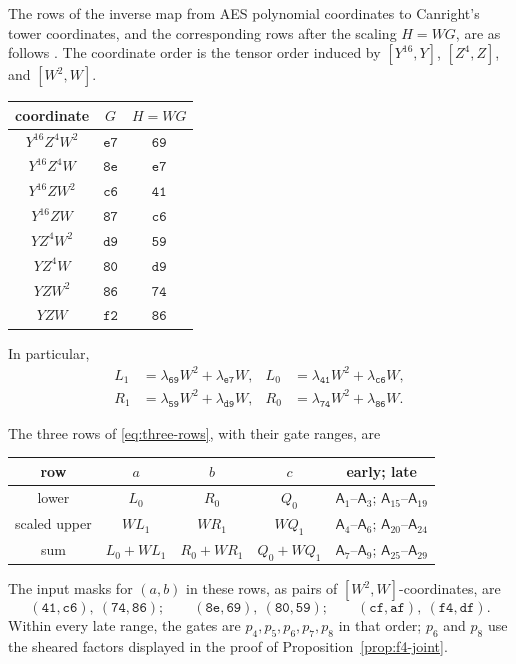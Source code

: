 \documentclass[11pt]{article}
\newcommand{\gate}[1]{\mathsf A_{#1}}
\begin{document}
\begin{samepage}
The rows of the inverse map from AES polynomial coordinates to Canright's
tower coordinates, and the corresponding rows after the scaling \(H=WG\),
are as follows \cite[Sec.~4, Eq.~(10)]{canright}.  The
coordinate order is the tensor order induced by
\([Y^{16},Y]\), \([Z^4,Z]\), and \([W^2,W]\).
\begin{center}
\begin{tabular}{@{}ccc@{}}
\toprule
coordinate&\(G\)&\(H=WG\)\\
\midrule
\(Y^{16}Z^4W^2\)&\(\mathtt{e7}\)&\(\mathtt{69}\)\\
\(Y^{16}Z^4W\)&\(\mathtt{8e}\)&\(\mathtt{e7}\)\\
\(Y^{16}ZW^2\)&\(\mathtt{c6}\)&\(\mathtt{41}\)\\
\(Y^{16}ZW\)&\(\mathtt{87}\)&\(\mathtt{c6}\)\\
\(YZ^4W^2\)&\(\mathtt{d9}\)&\(\mathtt{59}\)\\
\(YZ^4W\)&\(\mathtt{80}\)&\(\mathtt{d9}\)\\
\(YZW^2\)&\(\mathtt{86}\)&\(\mathtt{74}\)\\
\(YZW\)&\(\mathtt{f2}\)&\(\mathtt{86}\)\\
\bottomrule
\end{tabular}
\end{center}
\end{samepage}
In particular,
\begin{align*}
 L_1&=\lambda_{\mathtt{69}}W^2+\lambda_{\mathtt{e7}}W,&
 L_0&=\lambda_{\mathtt{41}}W^2+\lambda_{\mathtt{c6}}W,\\
 R_1&=\lambda_{\mathtt{59}}W^2+\lambda_{\mathtt{d9}}W,&
 R_0&=\lambda_{\mathtt{74}}W^2+\lambda_{\mathtt{86}}W.
\end{align*}
\begin{samepage}
The three rows of \eqref{eq:three-rows}, with their gate ranges, are
\begin{center}
\begin{tabular}{@{}ccccc@{}}
\toprule
row&\(a\)&\(b\)&\(c\)&early; late\\
\midrule
lower&\(L_0\)&\(R_0\)&\(Q_0\)&\(\gate{1}\text{--}\gate{3}\); \(\gate{15}\text{--}\gate{19}\)\\
scaled upper&\(WL_1\)&\(WR_1\)&\(WQ_1\)&\(\gate{4}\text{--}\gate{6}\); \(\gate{20}\text{--}\gate{24}\)\\
sum&\(L_0+WL_1\)&\(R_0+WR_1\)&\(Q_0+WQ_1\)&\(\gate{7}\text{--}\gate{9}\); \(\gate{25}\text{--}\gate{29}\)\\
\bottomrule
\end{tabular}
\end{center}
\end{samepage}
The input masks for \((a,b)\) in these rows, as pairs of
\([W^2,W]\)-coordinates, are
\[
 (\mathtt{41},\mathtt{c6}),\ (\mathtt{74},\mathtt{86});\qquad
 (\mathtt{8e},\mathtt{69}),\ (\mathtt{80},\mathtt{59});\qquad
 (\mathtt{cf},\mathtt{af}),\ (\mathtt{f4},\mathtt{df}).
\]
Within every late range, the gates are \(p_4,p_5,p_6,p_7,p_8\) in that
order; \(p_6\) and \(p_8\) use the sheared factors displayed in the proof
of Proposition~\ref{prop:f4-joint}.
\end{document}
